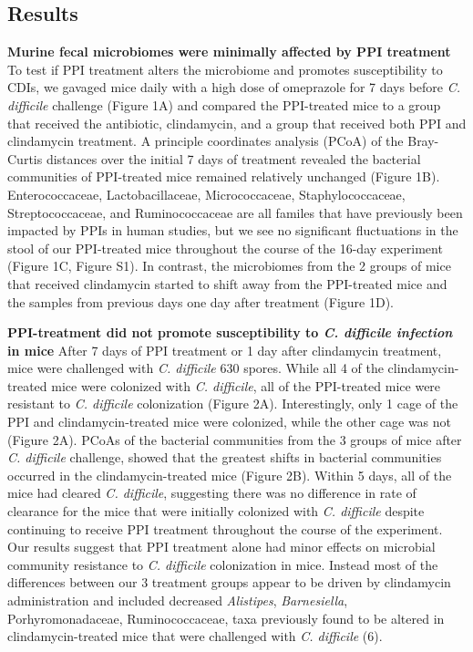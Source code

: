 \documentclass[11pt,]{article}
\begin{document}
\subsection{Results}\label{results}

\textbf{Murine fecal microbiomes were minimally affected by PPI
treatment } To test if PPI treatment alters the microbiome and promotes
susceptibility to CDIs, we gavaged mice daily with a high dose of
omeprazole for 7 days before \emph{C. difficile} challenge (Figure 1A)
and compared the PPI-treated mice to a group that received the
antibiotic, clindamycin, and a group that received both PPI and
clindamycin treatment. A principle coordinates analysis (PCoA) of the
Bray-Curtis distances over the initial 7 days of treatment revealed the
bacterial communities of PPI-treated mice remained relatively unchanged
(Figure 1B). Enterococcaceae, Lactobacillaceae, Micrococcaceae,
Staphylococcaceae, Streptococcaceae, and Ruminococcaceae are all familes
that have previously been impacted by PPIs in human studies, but we see
no significant fluctuations in the stool of our PPI-treated mice
throughout the course of the 16-day experiment (Figure 1C, Figure S1).
In contrast, the microbiomes from the 2 groups of mice that received
clindamycin started to shift away from the PPI-treated mice and the
samples from previous days one day after treatment (Figure 1D).

\textbf{PPI-treatment did not promote susceptibility to \emph{C.
difficile infection} in mice} After 7 days of PPI treatment or 1 day
after clindamycin treatment, mice were challenged with \emph{C.
difficile} 630 spores. While all 4 of the clindamycin-treated mice were
colonized with \emph{C. difficile}, all of the PPI-treated mice were
resistant to \emph{C. difficile} colonization (Figure 2A).
Interestingly, only 1 cage of the PPI and clindamycin-treated mice were
colonized, while the other cage was not (Figure 2A). PCoAs of the
bacterial communities from the 3 groups of mice after \emph{C.
difficile} challenge, showed that the greatest shifts in bacterial
communities occurred in the clindamycin-treated mice (Figure 2B). Within
5 days, all of the mice had cleared \emph{C. difficile}, suggesting
there was no difference in rate of clearance for the mice that were
initially colonized with \emph{C. difficile} despite continuing to
receive PPI treatment throughout the course of the experiment. Our
results suggest that PPI treatment alone had minor effects on microbial
community resistance to \emph{C. difficile} colonization in mice.
Instead most of the differences between our 3 treatment groups appear to
be driven by clindamycin administration and included decreased
\emph{Alistipes}, \emph{Barnesiella}, Porhyromonadaceae,
Ruminococcaceae, taxa previously found to be altered in
clindamycin-treated mice that were challenged with \emph{C. difficile}
(6).
\end{document}
